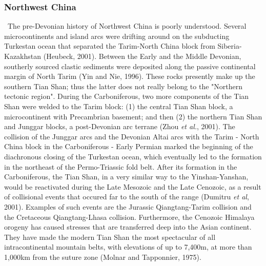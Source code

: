 \documentclass{article}
\begin{document}
 \subsubsection*{Northwest China} \label{sec:northwest}
 ~\indent  The  pre-Devonian  history  of  Northwest  China  is  poorly
 understood.   Several microcontinents and  island arcs  were drifting
 around  on   the  subducting  Turkestan  ocean   that  separated  the
 Tarim-North  China  block  from Siberia-Kazakhstan  (Heubeck,  2001).
 Between the Early and  the Middle Devonian, southerly sourced clastic
 sediments  were deposited  along  the passive  continental margin  of
 North Tarim (Yin  and Nie, 1996).  These rocks  presently make up the
 southern Tian  Shan; thus  the latter does  not really belong  to the
 "Northern  tectonic  region".  During  the  Carboniferous,  two  more
 components of the  Tian Shan were welded to the  Tarim block: (1) the
 central Tian Shan block,  a microcontinent with Precambrian basement;
 and  then  (2)   the  northern  Tian  Shan  and   Junggar  blocks,  a
 post-Devonian arc terrane (Zhou {\it et al.}, 2001).  The collision of
 the Junggar arcs  and the Devonian Altai arcs with  the Tarim - North
 China block in the Carboniferous - Early Permian marked the beginning
 of the  diachronous closing of the Turkestan  ocean, which eventually
 led  to the  formation in  the northeast  of the  Permo-Triassic fold
 belt.  After its formation in  the Carboniferous, the Tian Shan, in a
 very similar way to  the Yinshan-Yanshan, would be reactivated during
 the Late Mesozoic  and the Late Cenozoic, as  a result of collisional
 events that  occured far to the  south of the range  (Dumitru {\it et
 al}, 2001).  Examples of such events are the Jurassic Qiangtang-Tarim
 collision and the Cretaceous Qiangtang-Lhasa collision.  Furthermore,
 the  Cenozoic   Himalaya  orogeny   has  caused  stresses   that  are
 transferred deep into the Asian continent.  They have made the modern
 Tian  Shan  the most  spectacular  of  all intracontinental  mountain
 belts, with elevations of up to 7,400m, at more than 1,000km from the
 suture zone (Molnar and Tapponnier, 1975).
\end{document}
